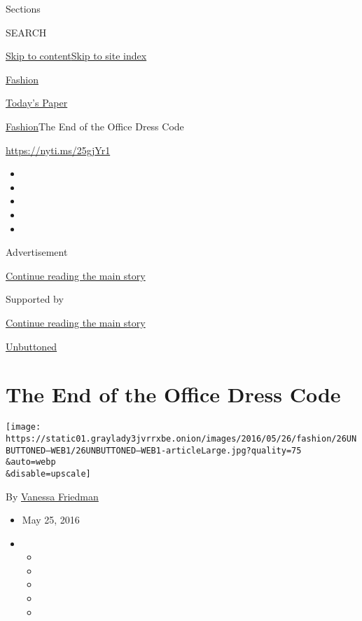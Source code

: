 Sections

SEARCH

\protect\hyperlink{site-content}{Skip to
content}\protect\hyperlink{site-index}{Skip to site index}

\href{https://www.nytimes3xbfgragh.onion/section/fashion}{Fashion}

\href{https://myaccount.nytimes3xbfgragh.onion/auth/login?response_type=cookie\&client_id=vi}{}

\href{https://www.nytimes3xbfgragh.onion/section/todayspaper}{Today's
Paper}

\href{/section/fashion}{Fashion}\textbar{}The End of the Office Dress
Code

\url{https://nyti.ms/25gjYr1}

\begin{itemize}
\item
\item
\item
\item
\item
\end{itemize}

Advertisement

\protect\hyperlink{after-top}{Continue reading the main story}

Supported by

\protect\hyperlink{after-sponsor}{Continue reading the main story}

\href{/column/unbuttoned}{Unbuttoned}

\hypertarget{the-end-of-the-office-dress-code}{%
\section{The End of the Office Dress
Code}\label{the-end-of-the-office-dress-code}}

\texttt{[image: https://static01.graylady3jvrrxbe.onion/images/2016/05/26/fashion/26UNBUTTONED--WEB1/26UNBUTTONED--WEB1-articleLarge.jpg?quality=75\\\&auto=webp\\\&disable=upscale]}

By \href{https://www.nytimes3xbfgragh.onion/by/vanessa-friedman}{Vanessa
Friedman}

\begin{itemize}
\item
  May 25, 2016
\item
  \begin{itemize}
  \item
  \item
  \item
  \item
  \item
  \end{itemize}
\end{itemize}

